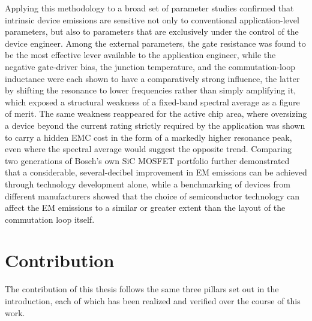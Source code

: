 Applying this methodology to a broad set of parameter studies confirmed that intrinsic device emissions are sensitive not only to conventional application-level parameters, but also to parameters that are exclusively under the control of the device engineer.
Among the external parameters, the gate resistance was found to be the most effective lever available to the application engineer, while the negative gate-driver bias, the junction temperature, and the commutation-loop inductance were each shown to have a comparatively strong influence, the latter by shifting the resonance to lower frequencies rather than simply amplifying it, which exposed a structural weakness of a fixed-band spectral average as a figure of merit.
The same weakness reappeared for the active chip area, where oversizing a device beyond the current rating strictly required by the application was shown to carry a hidden EMC cost in the form of a markedly higher resonance peak, even where the spectral average would suggest the opposite trend.
Comparing two generations of Bosch's own SiC MOSFET portfolio further demonstrated that a considerable, several-decibel improvement in EM emissions can be achieved through technology development alone, while a benchmarking of devices from different manufacturers showed that the choice of semiconductor technology can affect the EM emissions to a similar or greater extent than the layout of the commutation loop itself.

\section*{Contribution}

The contribution of this thesis follows the same three pillars set out in the introduction, each of which has been realized and verified over the course of this work.

